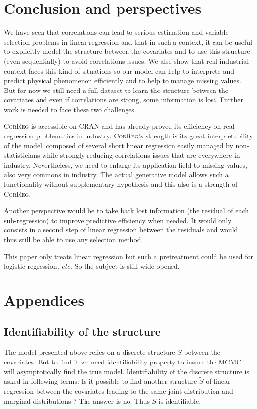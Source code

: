 \documentclass[11pt,a4paper]{article}
\begin{document}
\section{Conclusion and perspectives}
	We have seen that correlations can lead to serious estimation and variable selection problems in linear regression and that in such a context, it can be useful to explicitly model the structure between the covariates and to use this structure (even sequentially) to avoid correlations issues. We also show that real industrial context faces this kind of situations so our model can help to interprete and predict physical phenomenon efficiently and to help to manage missing values. But for now we still need a full dataset to learn the structure between the covariates and even if correlations are strong, some information is lost. Further work is needed to face these two challenges.
	
	\textsc{CorReg} is accessible on CRAN and has already proved its efficiency on real regression problematics in industry. \textsc{CorReg}'s strength is its great interpretability of the model, composed of several short linear regression easily managed by non-statisticians while strongly reducing correlations issues that are everywhere in industry.
	Nevertheless, we need to enlarge its application field to missing values, also very commons in industry. The actual generative model allows such a functionality without supplementary hypothesis and this also is a strength of \textsc{CorReg}. 
	
	Another perspective would be to take back lost information (the residual of each sub-regression) to improve predictive efficiency when needed. It would only consists in a second step of linear regression between the residuals and would thus still be able to use any selection method.
	
	This paper only treats linear regression but such a pretreatment could be used for logistic regression, {\it etc.}
	So the subject is still wide opened.	
	
{}

\section{Appendices}
	\subsection{Identifiability of the structure}
	The model presented above relies on a discrete structure $S$ between the covariates. But to find it we need identifiability property to insure the MCMC will asymptotically find the true model. Identifiability of the discrete structure is asked in following terms: Is it possible to find another structure $\tilde{S}$ of linear regression between the covariates leading to the same joint distribution and marginal distributions ? The answer is no. Thus $S$ is identifiable.
	
\end{document}
